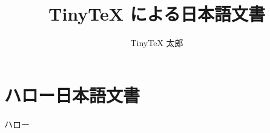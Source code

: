 \documentclass[lualatex,ja=standard,jafont=haranoaji]{bxjsarticle}
\title{TinyTeX による日本語文書}
\author{TinyTeX 太郎}
\begin{document}
\maketitle

\section{ハロー日本語文書}

ハロー
\end{document}
